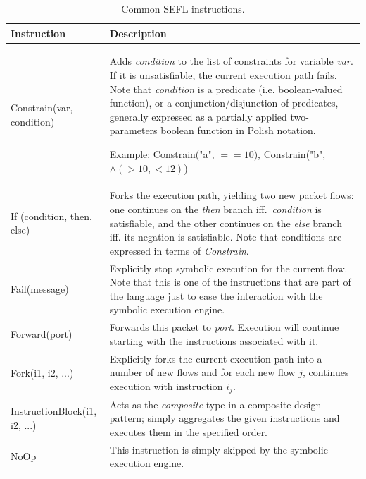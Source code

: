 \begin{table}
  \small
  \centering
  \begin{tabular}{ | l | p{10cm} |}
    \hline
    \textbf{Instruction} & \textbf{Description} \\ \hline

    Constrain(var, condition) & Adds \emph{condition} to the list of
    constraints for variable \emph{var}.  If it is unsatisfiable, the current
    execution path fails. Note that \emph{condition} is a predicate (i.e.
    boolean-valued function), or a conjunction/disjunction of predicates,
    generally expressed as a partially applied two-parameters boolean function
    in Polish notation.

    Example: Constrain("a", $== 10$), Constrain("b", $\land(> 10, < 12)$)
    \\ \hline

    If (condition, then, else) & Forks the execution path, yielding two new
    packet flows: one continues on the \emph{then} branch iff.\
    \emph{condition} is satisfiable, and the other continues on the \emph{else}
    branch iff. its negation is satisfiable.  Note that conditions are
    expressed in terms of \emph{Constrain}.
    \\ \hline

    Fail(message) & Explicitly stop symbolic execution for the current flow.
    Note that this is one of the instructions that are part of the language
    just to ease the interaction with the symbolic execution engine.
    \\ \hline

    Forward(port) & Forwards this packet to \emph{port}.  Execution will
    continue starting with the instructions associated with it.
    \\ \hline

    Fork(i1, i2, ...) & Explicitly forks the current execution path into a number of new
    flows and for each new flow $j$, continues execution with instruction
    $i_{j}$.
    \\ \hline

    InstructionBlock(i1, i2, ...) & Acts as the \emph{composite} type in a
    composite design pattern; simply aggregates the given instructions and
    executes them in the specified order.
    \\ \hline

    NoOp & This instruction is simply skipped by the symbolic execution engine.
    \\ \hline
  \end{tabular}
  \caption{Common SEFL instructions.}
  \label{tab:sefl-instr}
\end{table}

